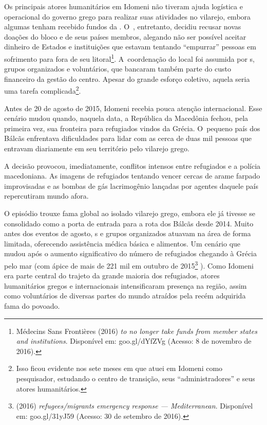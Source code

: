 Os principais atores humanitários em Idomeni não tiveram ajuda logística
e operacional do governo grego para realizar suas atividades no
vilarejo, embora algumas tenham recebido fundos da . O~,
entretanto, decidiu recusar novas doações do bloco e de seus países
membros, alegando não ser possível aceitar dinheiro de Estados e
instituições que estavam tentando ``empurrar'' pessoas em sofrimento
para fora de seu litoral\footnote{ Médecins Sans Frontières (2016) \emph{ to no
longer take funds from  member states and institutions}. Disponível
em:
goo.gl/dYfZVg
(Acesso: 8 de novembro de 2016).}. A~coordenação do local foi
assumida por s, grupos organizados e voluntários, que bancaram também
parte do custo financeiro da gestão do centro. Apesar do grande esforço
coletivo, aquela seria uma tarefa complicada\footnote{ Isso ficou evidente nos sete meses em que atuei em
Idomeni como pesquisador, estudando o centro de transição, seus
``administradores'' e seus atores humanitários.}.

Antes de 20 de agosto de 2015, Idomeni recebia pouca atenção
internacional. Esse cenário mudou quando, naquela data, a República da
Macedônia fechou, pela primeira vez, sua fronteira para refugiados vindos da Grécia.
O~pequeno país dos Bálcãs enfrentava dificuldades para
lidar com as cerca de duas mil pessoas que entravam diariamente em seu
território pelo vilarejo grego.

A decisão provocou, imediatamente, conflitos intensos entre
refugiados e a polícia macedoniana. As imagens de refugiados tentando
vencer cercas de arame farpado improvisadas e as bombas de gás
lacrimogênio lançadas por agentes daquele país repercutiram mundo afora.

O episódio trouxe fama global ao isolado vilarejo grego, embora ele já
tivesse se consolidado como a porta de entrada para a rota dos Bálcãs
desde 2014. Muito antes dos eventos de agosto, s e grupos organizados
atuavam na área de forma limitada, oferecendo assistência médica básica
e alimentos. Um cenário que mudou após o aumento significativo do número
de refugiados chegando à Grécia pelo mar (com ápice de mais de 221 mil
em outubro de 2015\footnote{  (2016) \emph{ refugees/migrants emergency
response --- Mediterranean}. Disponível em:
goo.gl/31yJ59
(Acesso: 30 de setembro
de 2016).} ). Como Idomeni era parte central do
trajeto da grande maioria dos refugiados, atores humanitários gregos e
internacionais intensificaram presença na região, assim como voluntários
de diversas partes do mundo atraídos pela recém adquirida fama do
povoado.

